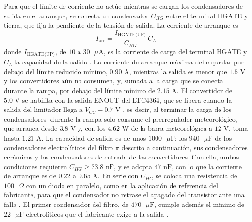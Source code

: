 \documentclass[../../General.tex]{subfiles}
\begin{document}
Para que el límite de corriente no actúe mientras se cargan los condensadores de salida en el arranque, se conecta un condensador $C_{HG}$ entre el terminal HGATE y tierra, que fija la pendiente de la tensión de salida. La corriente de arranque es \citep{adi_ltc4364}
\begin{equation}
I_{\text{arr}} = \frac{I_{\text{HGATE(UP)}}}{C_{HG}}\, C_L
\end{equation}
donde $I_{\text{HGATE(UP)}}$, de $10$ a $30\text{ }\mu\text{A}$, es la corriente de carga del terminal HGATE y $C_L$ la capacidad de la salida \citep{adi_ltc4364}. La corriente de arranque máxima debe quedar por debajo del límite reducido mínimo, $0.90\text{ A}$, mientras la salida es menor que $1.5\text{ V}$ y los convertidores aún no consumen, y, sumada a la carga que se conecta durante la rampa, por debajo del límite mínimo de $2.15\text{ A}$. El convertidor de $5.0\text{ V}$ se habilita con la salida ENOUT del LTC4364, que se libera cuando la salida del limitador llega a $V_{CC} - 0.7\text{ V}$ \citep{adi_ltc4364}, es decir, al terminar la carga de los condensadores; durante la rampa solo consume el prerregulador meteorológico, que arranca desde $3.8\text{ V}$ \citep{ti_lmr33630} y, con los $4.62\text{ W}$ de la barra meteorológica a $12\text{ V}$, toma hasta $1.21\text{ A}$. La capacidad de salida es de unos $1000\text{ }\mu\text{F}$: los $940\text{ }\mu\text{F}$ de los condensadores electrolíticos del filtro $\pi$ descrito a continuación, sus condensadores cerámicos y los condensadores de entrada de los convertidores. Con ella, ambas condiciones requieren $C_{HG} \geq 33.8\text{ nF}$, y se adopta $47\text{ nF}$, con lo que la corriente de arranque es de $0.22$ a $0.65\text{ A}$. En serie con $C_{HG}$ se coloca una resistencia de $100\text{ }\Omega$ con un diodo en paralelo, como en la aplicación de referencia del fabricante, para que el condensador no retrase el apagado del transistor ante una falla \citep{adi_ltc4364}. El primer condensador del filtro, de $470\text{ }\mu\text{F}$, cumple además el mínimo de $22\text{ }\mu\text{F}$ electrolíticos que el fabricante exige a la salida \citep{adi_ltc4364}.
\end{document}
